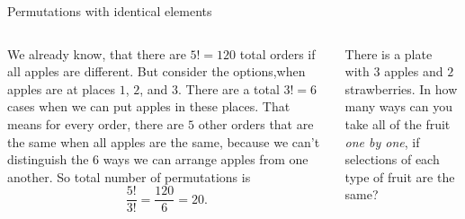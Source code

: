 \documentclass[9pt,aspectratio=169]{beamer}
\begin{document}
\begin{frame}{Permutations with identical elements}
\begin{columns}[T]
\begin{column}{0.5\textwidth}
      {\small
      We already know, that there are $5! = 120$ total orders if all apples are different. But consider the options,when apples are at places $1$, $2$, and $3$. There are a total $3! = 6$ cases when we can put apples in these places. That means for every order, there are $5$ other orders that are the same when all apples are the same, because we can’t distinguish the $6$ ways we can arrange apples from one another. So total number of permutations is}
      \[
        \frac{5!}{3!} = \frac{120}{6} = 20.
      \]
    \end{column}
    \begin{column}{0.5\textwidth}
      \begin{problem}
        There is a plate with $3$ apples and $2$ strawberries. In how many ways can you take all of the fruit \emph{one by one}, if selections of each type of fruit are the same?
      \end{problem}

      \begin{nscenter}
      \end{nscenter}


\end{column}
\end{columns}
\end{frame}
\end{document}
